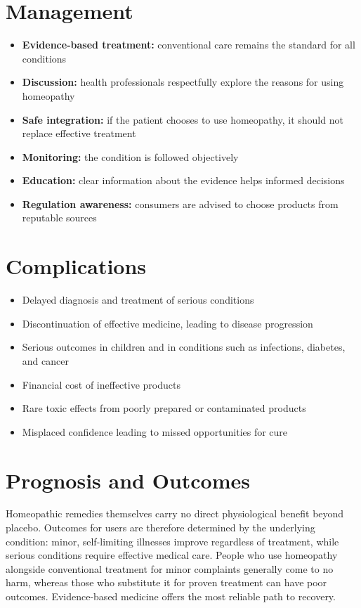 \section*{Management}
\begin{itemize}
    \item \textbf{Evidence-based treatment:} conventional care remains the standard for all conditions
    \item \textbf{Discussion:} health professionals respectfully explore the reasons for using homeopathy
    \item \textbf{Safe integration:} if the patient chooses to use homeopathy, it should not replace effective treatment
    \item \textbf{Monitoring:} the condition is followed objectively
    \item \textbf{Education:} clear information about the evidence helps informed decisions
    \item \textbf{Regulation awareness:} consumers are advised to choose products from reputable sources
\end{itemize}

\section*{Complications}
\begin{itemize}
    \item Delayed diagnosis and treatment of serious conditions
    \item Discontinuation of effective medicine, leading to disease progression
    \item Serious outcomes in children and in conditions such as infections, diabetes, and cancer
    \item Financial cost of ineffective products
    \item Rare toxic effects from poorly prepared or contaminated products
    \item Misplaced confidence leading to missed opportunities for cure
\end{itemize}

\section*{Prognosis and Outcomes}
Homeopathic remedies themselves carry no direct physiological benefit beyond placebo. Outcomes for users are therefore determined by the underlying condition: minor, self-limiting illnesses improve regardless of treatment, while serious conditions require effective medical care. People who use homeopathy alongside conventional treatment for minor complaints generally come to no harm, whereas those who substitute it for proven treatment can have poor outcomes. Evidence-based medicine offers the most reliable path to recovery.

